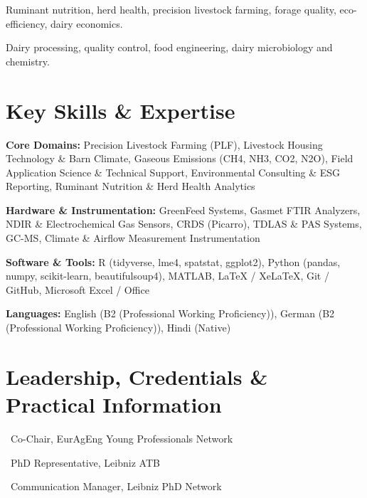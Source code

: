\documentclass[10pt,a4paper]{article}
\begin{document}

{\small Ruminant nutrition, herd health, precision livestock farming, forage quality, eco-efficiency, dairy economics.}\par



{\small Dairy processing, quality control, food engineering, dairy microbiology and chemistry.}\par



\section*{Key Skills \& Expertise}
\textbf{Core Domains:} Precision Livestock Farming (PLF), Livestock Housing Technology \& Barn Climate, Gaseous Emissions (CH4, NH3, CO2, N2O), Field Application Science \& Technical Support, Environmental Consulting \& ESG Reporting, Ruminant Nutrition \& Herd Health Analytics\par

\textbf{Hardware \& Instrumentation:} GreenFeed Systems, Gasmet FTIR Analyzers, NDIR \& Electrochemical Gas Sensors, CRDS (Picarro), TDLAS \& PAS Systems, GC-MS, Climate \& Airflow Measurement Instrumentation\par

\textbf{Software \& Tools:} R (tidyverse, lme4, spatstat, ggplot2), Python (pandas, numpy, scikit-learn, beautifulsoup4), MATLAB, LaTeX / XeLaTeX, Git / GitHub, Microsoft Excel / Office\par
\textbf{Languages:} English (B2 (Professional Working Proficiency)), German (B2 (Professional Working Proficiency)), Hindi (Native)


\section*{Leadership, Credentials \& Practical Information}

\textbullet\ Co-Chair, EurAgEng Young Professionals Network\par

\textbullet\ PhD Representative, Leibniz ATB\par

\textbullet\ Communication Manager, Leibniz PhD Network\par
\end{document}
